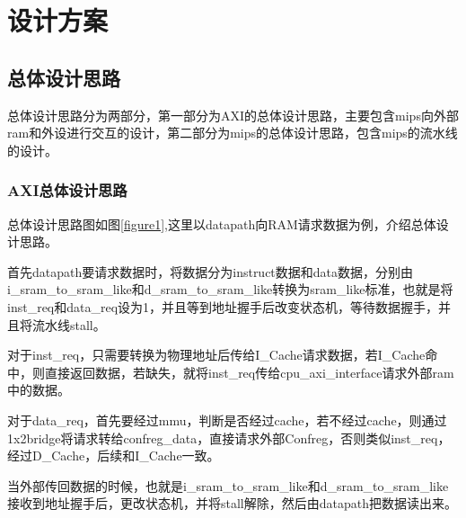 \section{设计方案}
\subsection{总体设计思路}

总体设计思路分为两部分，第一部分为AXI的总体设计思路，主要包含mips向外部ram和外设进行交互的设计，第二部分为mips的总体设计思路，包含mips的流水线的设计\cite{cqu硬件综合文档}。

\subsubsection{AXI总体设计思路}

总体设计思路图如图\ref{figure1},这里以datapath向RAM请求数据为例，介绍总体设计思路。

首先datapath要请求数据时，将数据分为instruct数据和data数据，分别由i\_sram\_to\_sram\_like和d\_sram\_to\_sram\_like转换为sram\_like标准，也就是将inst\_req和data\_req设为1，并且等到地址握手后改变状态机，等待数据握手，并且将流水线stall。

对于inst\_req，只需要转换为物理地址后传给I\_Cache请求数据，若I\_Cache命中，则直接返回数据，若缺失，就将inst\_req传给cpu\_axi\_interface请求外部ram中的数据。

对于data\_req，首先要经过mmu，判断是否经过cache，若不经过cache，则通过1x2bridge将请求转给confreg\_data，直接请求外部Confreg，否则类似inst\_req，经过D\_Cache，后续和I\_Cache一致。

当外部传回数据的时候，也就是i\_sram\_to\_sram\_like和d\_sram\_to\_sram\_like接收到地址握手后，更改状态机，并将stall解除，然后由datapath把数据读出来。

